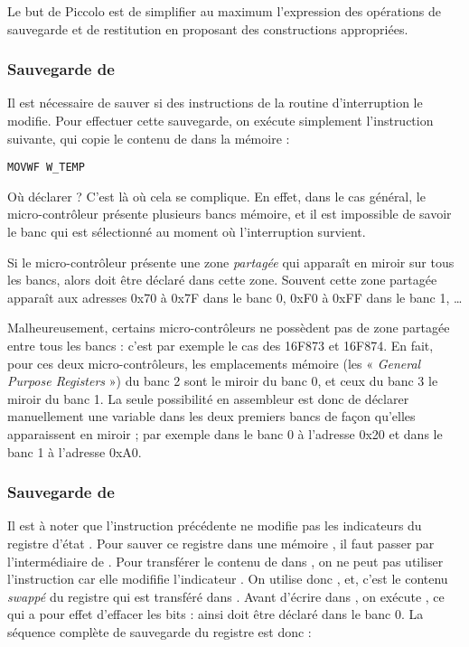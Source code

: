 Le but de Piccolo est de simplifier au maximum l'expression des opérations de sauvegarde et de restitution en proposant des constructions appropriées.

\subsubsection{Sauvegarde de }

Il est nécessaire de sauver  si des instructions de la routine d'interruption le modifie. Pour effectuer cette sauvegarde, on exécute simplement l'instruction suivante, qui copie le contenu de  dans la mémoire  :

\begin{lstlisting}[language=assembleur]
MOVWF W_TEMP 
\end{lstlisting}

Où déclarer  ? C'est là où cela se complique. En effet, dans le cas général, le micro-contrôleur présente plusieurs bancs mémoire, et il est impossible de savoir le banc qui est sélectionné au moment où l'interruption survient.

Si le micro-contrôleur présente une zone \emph{partagée} qui apparaît en miroir sur tous les bancs, alors  doit être déclaré dans cette zone. Souvent cette zone partagée apparaît aux adresses 0x70 à 0x7F dans le banc 0, 0xF0 à 0xFF dans le banc 1, …

Malheureusement, certains micro-contrôleurs ne possèdent pas de zone partagée entre tous les bancs : c'est par exemple le cas des 16F873 et 16F874. En fait, pour ces deux micro-contrôleurs, les emplacements mémoire (les « \emph{General Purpose Registers} ») du banc 2 sont le miroir du banc 0, et ceux du banc 3 le miroir du banc 1. La seule possibilité en assembleur est donc de déclarer manuellement une variable dans les deux premiers bancs de façon qu'elles apparaissent en miroir ; par exemple  dans le banc 0 à l'adresse 0x20 et  dans le banc 1 à l'adresse 0xA0.


\subsubsection{Sauvegarde de }

Il est à noter que l'instruction précédente  ne modifie pas les indicateurs du registre d'état . Pour sauver ce registre dans une mémoire , il faut passer par l'intermédiaire de . Pour transférer le contenu de  dans , on ne peut pas utiliser l'instruction  car elle modififie l'indicateur . On utilise donc , et, c'est le contenu \emph{swappé} du registre  qui est transféré dans . Avant d'écrire  dans , on exécute , ce qui a pour effet d'effacer les bits  : ainsi  doit être déclaré dans le banc 0. La séquence complète de sauvegarde du registre  est donc :

